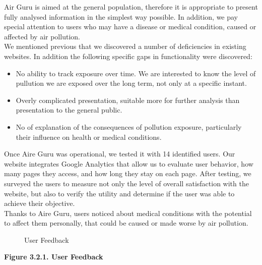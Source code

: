 Air Guru is aimed at the general population, therefore it is appropriate to present fully analysed information in the simplest way possible.
In addition, we pay special attention to users who may have a
disease or medical condition, caused or affected by air pollution.\\

We mentioned previous that we discovered a number of deficiencies in existing websites. In addition the following specific gaps in functionality were discovered:

\begin{itemize}
    \item No ability to track exposure over time. We are interested to know the level of pullution we are exposed over the long term, not only at a specific instant.
    \item Overly complicated presentation, suitable more for further analysis than presentation to the general public.
    \item No of explanation of the consequences of pollution exposure, particularly their influence on health or medical conditions.
\end{itemize}

Once Aire Guru was operational, we tested it with 14 identified users. Our website integrates Google Analytics that allow us to evaluate
user behavior, how many pages they access, and how long they stay on each page.
After testing, we surveyed the users to measure not only the level of overall satisfaction with the website,
but also to verify the utility and determine if the user was able to achieve their objective.\\

Thanks to Aire Guru, users noticed about medical conditions with the potential to affect them personally, that could be caused or made worse by air pollution.\\

\begin{figure}[ht]
    \centering
    \hfill
    \caption{User Feedback}
\end{figure}

\begin{center}
    \bf{Figure 3.2.1. User Feedback}
\end{center}